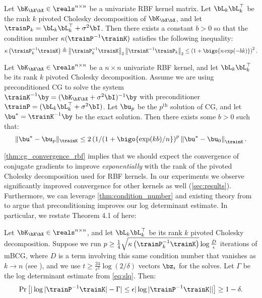 \begin{lemma}
  \label{thm:condition_number}
  Let $\bK_{\bX\bX} \in \reals^{n \times n}$ be a univariate RBF kernel matrix.
  Let $\bL_{k} \bL_k^\top$ be the rank $k$ pivoted Cholesky decomposition of $\bK_{\bX\bX}$, and let $\trainP_{k} = \bL_k \bL_k^\top + \sigma^{2}\bI$.
  Then there exists a constant $b>0$ so that the condition number $\kappa(\trainP^{-1}\trainK)$ satisfies the following inequality:
  \begin{equation}
    \kappa \left( \trainP_{k}^{-1}\trainK \right)
    \triangleq \left\Vert \trainP_{k}^{-1}\trainK \right\Vert_{2} \left\Vert \trainK^{-1}\trainP_{k} \right\Vert_{2}
    \leq \left( 1 + \bigo{n\exp(-bk)} \right)^2.
  \end{equation}
\end{lemma}
\begin{theorem}
  \label{thm:cg_convergence_rbf}
  Let $\bK_{\bX\bX} \in \reals^{n \times n}$ be a $n \times n$ univariate RBF kernel, and let $\bL_k \bL_k^\top$ be its rank $k$ pivoted Cholesky decomposition.
  Assume we are using preconditioned CG to solve the system $\trainK^{-1} \by = (\bK_{\bX\bX} + \sigma^2 \bI)^{-1} \by$ with preconditioner $\trainP = (\bL_k \bL_k^\top + \sigma^2 \bI)$.
  Let $\bu_p$ be the $p^\textrm{th}$ solution of CG, and let $\bu^{*} = \trainK^{-1} \by$ be the exact solution.
  Then there exists some $b > 0$ such that:
  \begin{equation}
    \Vert \bu^{*} - \bu_{p} \Vert_{\trainK}
    \leq 2 \left(1/(1 + \bigo{\exp(kb)/n}\right)^{p} \left\Vert \bu^{*} - \bu_{0} \right\Vert_{\trainK}.
  \end{equation}
\end{theorem}
%
\cref{thm:cg_convergence_rbf} implies that we should expect the convergence of conjugate gradients to improve \emph{exponentially} with the rank of the pivoted Cholesky decomposition used for RBF kernels. In our experiments we observe significantly improved convergence for other kernels as well (\cref{sec:results}). Furthermore, we can leverage \cref{thm:condition_number} and existing theory from \cite{ubaru2017fast} to argue that preconditioning improves our log determinant estimate. In particular, we restate Theorem 4.1 of \citet{ubaru2017fast} here:
\begin{theorem}
  \label{thm:slq_convergence}
  Let $\bK_{\bX\bX} \in \reals^{n \times n}$, and let $\bL_k \bL_k^\top$ be its rank $k$ pivoted Cholesky decomposition. Suppose we run $p \geq \frac{1}{4} \sqrt{ \kappa \left( \trainP_{k}^{-1}\trainK \right) } \log \frac{D}{\epsilon}$ iterations of mBCG, where $D$ is a term involving this same condition number that vanishes as $k \to n$ (see \cite{ubaru2017fast}), and we use $t \geq \frac{24}{\epsilon^{2}}\log(2/\delta)$ vectors $\bz_{i}$ for the solves. Let $\Gamma$ be the log determinant estimate from \eqref{eq:slq}. Then:
  \begin{equation}
    \textrm{Pr}\left[\vert \log \vert \trainP^{-1}\trainK \vert - \Gamma \vert \leq \epsilon\vert \log \vert \trainP^{-1}\trainK \vert \vert \right] \geq 1 - \delta.
  \end{equation}
\end{theorem}

